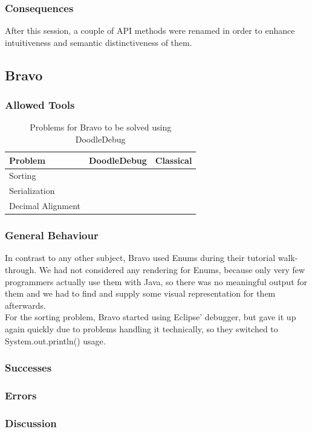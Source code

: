 \documentclass[a4paper,ngerman,english]{amsbook} %
\newcommand{\tick}{\ding{51}}
\begin{document}
\subsubsection{Consequences}
After this session, a couple of API methods were renamed in order to enhance intuitiveness and semantic distinctiveness of them.
\\

\subsection{Bravo}
\subsubsection{Allowed Tools}
\begin{table}[h]
\centering
\begin{tabular}{l c c}
{\bf Problem} & {\bf DoodleDebug} & {\bf Classical} \\ \hline
Sorting &  & \tick \\
Serialization & \tick &  \\
Decimal Alignment &  & \tick \\
\end{tabular}
\caption{Problems for Bravo to be solved using DoodleDebug}
\end{table}
\subsubsection{General Behaviour}
In contrast to any other subject, Bravo used Enums during their tutorial walk-through. We had not considered any rendering for Enums, because only very few programmers actually use them with Java, so there was no meaningful output for them and we had to find and supply some visual representation for them afterwards.\\
For the sorting problem, Bravo started using Eclipse' debugger, but gave it up again quickly due to problems handling it technically, so they switched to System.out.println() usage.
\subsubsection{Successes}
\subsubsection{Errors}
\subsubsection{Discussion}
\end{document}
